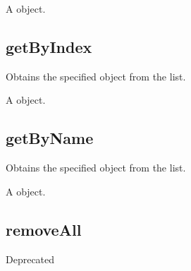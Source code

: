 \documentclass[letterpaper,12pt,english,openany,oneside]{sphinxmanual}
\begin{document}
\label{\detokenize{JS_3D_API:section-110}}\label{\detokenize{JS_3D_API:returns-110}}

A  object.


\subsection{getByIndex}
\label{\detokenize{JS_3D_API:getbyindex}}
Obtains the specified  object from the list.

\label{\detokenize{JS_3D_API:syntax-110}}

\begin{sphinxVerbatim}[commandchars=\\\{\}]
\end{sphinxVerbatim}
\label{\detokenize{JS_3D_API:parameters-80}}

\label{\detokenize{JS_3D_API:section-111}}\label{\detokenize{JS_3D_API:returns-111}}

A  object.


\subsection{getByName}
\label{\detokenize{JS_3D_API:getbyname}}
Obtains the specified  object from the list.

\label{\detokenize{JS_3D_API:syntax-111}}

\begin{sphinxVerbatim}[commandchars=\\\{\}]
\end{sphinxVerbatim}
\label{\detokenize{JS_3D_API:parameters-81}}

\label{\detokenize{JS_3D_API:section-112}}\label{\detokenize{JS_3D_API:returns-112}}

A  object.


\subsection{removeAll}
\label{\detokenize{JS_3D_API:removeall}}
Deprecated
\end{document}

